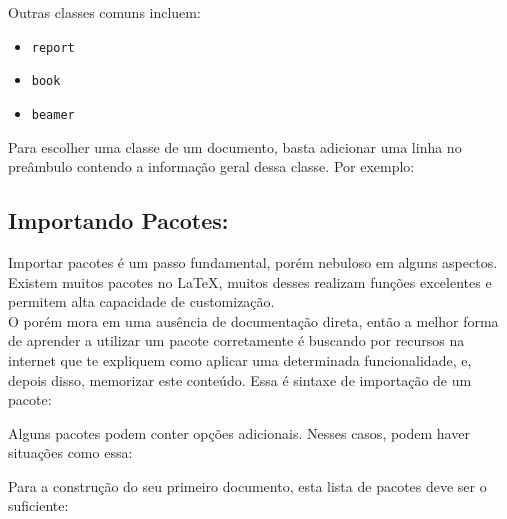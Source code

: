 \documentclass{article}
\begin{document}
Outras classes comuns incluem:
\begin{itemize}
	\item \texttt{report}
	\item \texttt{book}
	\item \texttt{beamer}
\end{itemize}

Para escolher uma classe de um documento, basta adicionar uma linha no preâmbulo contendo a informação geral dessa classe. Por exemplo:


\subsection{Importando Pacotes:}

Importar pacotes é um passo fundamental, porém nebuloso em alguns aspectos. Existem muitos pacotes no LaTeX, muitos desses realizam funções excelentes e permitem alta capacidade de customização. \\
 
O porém mora em uma ausência de documentação direta, então a melhor forma de aprender a utilizar um pacote corretamente é buscando por recursos na internet que te expliquem como aplicar uma determinada funcionalidade, e, depois disso, memorizar este conteúdo. Essa é sintaxe de importação de um pacote:



\begin{teX}
	\usepackage{pacote}
\end{teX}

Alguns pacotes podem conter opções adicionais. Nesses casos, podem haver situações como essa:

\begin{teX}
	\usepackage[opções]{pacote}
\end{teX}

Para a construção do seu primeiro documento, esta lista de pacotes deve ser o suficiente:


\begin{teX}
	\usepackage[brazil]{babel} %
	\usepackage[T1]{fontenc} %
	\usepackage{lmodern}  %
	\usepackage{graphicx} %
	\usepackage{microtype} %
\end{teX}
\end{document}
